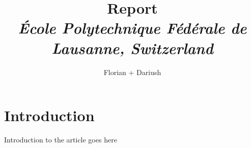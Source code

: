 \documentclass[10pt,a4paper,oneside,twocolumn]{article} %
\numberwithin{equation}{section} %
\begin{document}
\title{\huge{\textbf{Report}}\\
	\vspace{0.5cm}
	\Large{\textit{\'Ecole Polytechnique F\'ed\'erale de Lausanne, Switzerland}}}
\author{\large{Florian + Dariush}}

\begin{titlepage}
 \maketitle
\thispagestyle{empty}
\end{titlepage}

\section{Introduction}
    Introduction to the article goes here \\
\end{document}
